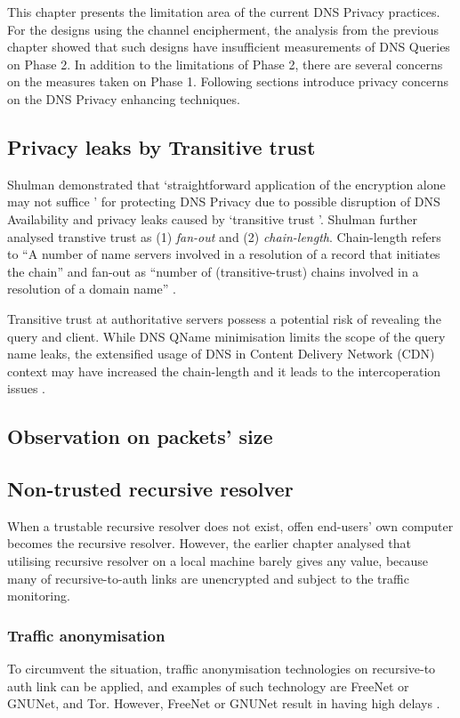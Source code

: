 This chapter presents the limitation area of the current DNS Privacy practices.
For the designs using the channel encipherment, the analysis from the previous chapter showed that such designs have insufficient measurements of DNS Queries on Phase 2.
In addition to the limitations of Phase 2, there are several concerns on the measures taken on Phase 1. Following sections introduce privacy concerns on the DNS Privacy enhancing techniques.

\subsection{Privacy leaks by Transitive trust}
Shulman demonstrated that `straightforward application of the encryption alone may not suffice \cite{Shulman:2014}' for protecting DNS Privacy due to possible disruption of DNS Availability and privacy leaks caused by `transitive trust \cite{Ramasubramanian:2005}'.
Shulman further analysed transtive trust as (1) \textit{fan-out} and (2) \textit{chain-length}.
Chain-length refers to ``A number of name servers involved in a resolution of a record that initiates the chain'' and fan-out as ``number of (transitive-trust) chains involved in a resolution of a domain name'' \cite{Shulman:2014}.

Transitive trust at authoritative servers possess a potential risk of revealing the query and client. While DNS QName minimisation \cite{bortzmeyer2016dns} limits the scope of the query name leaks, the extensified usage of DNS in Content Delivery Network (CDN) context \cite{WANG2018235} may have increased the chain-length and it leads to the intercoperation issues \cite{Huque-QNAME-Min-analysis}.

\subsection{Observation on packets' size}

\subsection{Non-trusted recursive resolver}
When a trustable recursive resolver does not exist, offen end-users' own computer becomes the recursive resolver. However, the earlier chapter analysed that utilising recursive resolver on a local machine barely gives any value, because many of recursive-to-auth links are unencrypted and subject to the traffic monitoring.

\subsubsection{Traffic anonymisation}
To circumvent the situation, traffic anonymisation technologies on recursive-to auth link can be applied, and examples of such technology are  FreeNet \cite{clarke2001freenet} or GNUNet\cite{grothoff2017gnunet}, and Tor.
However, FreeNet \cite{clarke2001freenet} or GNUNet \cite{grothoff2017gnunet} result in having high delays \cite{anonymousoverdns}.

